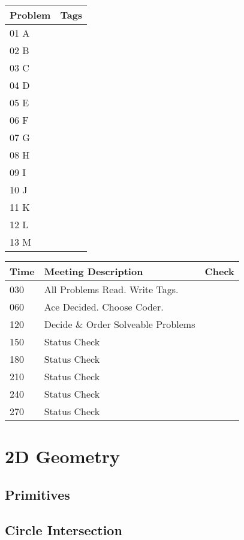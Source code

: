 \documentclass[twocolumn]{article}
\begin{document}
	\tableofcontents

	\begin{tabular}{| l || m{7cm} | }
		\hline
		\textbf{Problem} & \textbf{Tags}\\	\hline
		01 A & \\	\hline
		02 B & \\	\hline
		03 C & \\	\hline
		04 D & \\	\hline
		05 E & \\	\hline
		06 F & \\	\hline
		07 G & \\	\hline
		08 H & \\	\hline
		09 I & \\	\hline
		10 J & \\	\hline
		11 K & \\	\hline
		12 L & \\	\hline
		13 M & \\	\hline
	\end{tabular}
	\newline\newline\newline
	\begin{tabular}{| l | l || m{12mm}| }
		\hline
		\textbf{Time} & \textbf{Meeting Description} & \textbf{Check} \\	\hline
		030 & All Problems Read. Write Tags. & 	\\	\hline
		060 & Ace Decided. Choose Coder.	&	\\	\hline
		120 & Decide \& Order Solveable Problems &	\\	\hline
		150 & Status Check &	\\	\hline
		180 & Status Check &	\\	\hline
		210 & Status Check &	\\	\hline
		240 & Status Check &	\\	\hline
		270 & Status Check &	\\	\hline
	\end{tabular}
	\newpage

	\section{2D Geometry}
		\subsection{Primitives}
		
		\subsection{Circle Intersection}
\end{document}
